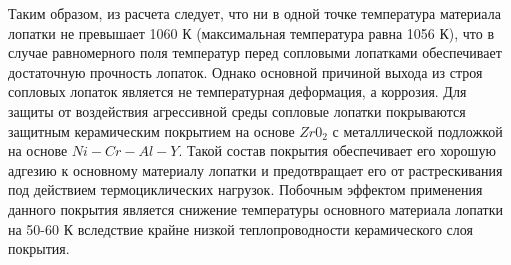 Таким образом, из расчета следует, что ни в одной точке температура материала лопатки не превышает 1060 К (максимальная температура
равна 1056 К), что в случае равномерного поля температур перед сопловыми лопатками обеспечивает достаточную прочность лопаток.
Однако основной причиной выхода из строя сопловых лопаток является не температурная деформация, а коррозия.
Для защиты от воздействия агрессивной среды сопловые лопатки покрываются защитным керамическим покрытием на основе
$Zr0_2$ с металлической подложкой на основе $Ni-Cr-Al-Y$. Такой состав покрытия обеспечивает его хорошую адгезию к
основному материалу лопатки и предотвращает его от растрескивания под действием термоциклических нагрузок.
Побочным эффектом применения данного покрытия является снижение температуры основного материала лопатки на 50-60 К вследствие крайне низкой теплопроводности керамического слоя покрытия.

